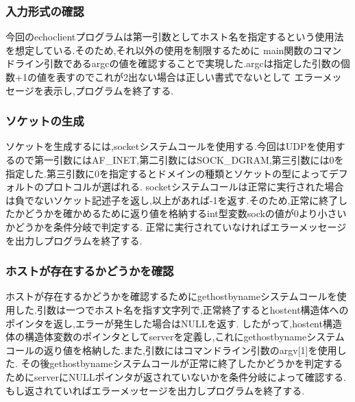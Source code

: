 \documentclass[dvipdfmx]{jarticle}
\begin{document}
\subsubsection{入力形式の確認}
今回のechoclientプログラムは第一引数としてホスト名を指定するという使用法を想定している.そのため,それ以外の使用を制限するために
main関数のコマンドライン引数であるargcの値を確認することで実現した.argcは指定した引数の個数+1の値を表すのでこれが2出ない場合は正しい書式でないとして
エラーメッセージを表示し,プログラムを終了する.
\subsubsection{ソケットの生成}
ソケットを生成するには,socketシステムコールを使用する.今回はUDPを使用するので第一引数にはAF\_INET,第二引数にはSOCK\_DGRAM,第三引数には0を指定した.第三引数に0を指定するとドメインの種類とソケットの型によってデフォルトのプロトコルが選ばれる.\cite{2}
socketシステムコールは正常に実行された場合は負でないソケット記述子を返し,以上があれば-1を返す.そのため,正常に終了したかどうかを確かめるために返り値を格納するint型変数sockの値が0より小さいかどうかを条件分岐で判定する.
正常に実行されていなければエラーメッセージを出力しプログラムを終了する.
\subsubsection{ホストが存在するかどうかを確認}
ホストが存在するかどうかを確認するためにgethostbynameシステムコールを使用した.引数は一つでホスト名を指す文字列で,正常終了するとhostent構造体へのポインタを返し,エラーが発生した場合はNULLを返す.\cite{1}
したがって,hostent構造体の構造体変数のポインタとしてserverを定義し,これにgethostbynameシステムコールの返り値を格納した.また,引数にはコマンドライン引数のargv[1]を使用した.
その後gethostbynameシステムコールが正常に終了したかどうかを判定するためにserverにNULLポインタが返されていないかを条件分岐によって確認する.もし返されていればエラーメッセージを出力しプログラムを終了する.
\end{document}
